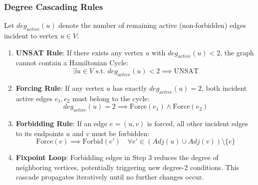 \subsubsection{Degree Cascading Rules}
Let $deg_{active}(u)$ denote the number of remaining active (non-forbidden) edges incident to vertex $u \in V$:
\begin{enumerate}
    \item \textbf{UNSAT Rule}: If there exists any vertex $u$ with $deg_{active}(u) < 2$, the graph cannot contain a Hamiltonian Cycle:
    \begin{equation}
        \exists u \in V \text{ s.t. } deg_{active}(u) < 2 \implies \text{UNSAT}
    \end{equation}
    \item \textbf{Forcing Rule}: If any vertex $u$ has exactly $deg_{active}(u) = 2$, both incident active edges $e_1, e_2$ must belong to the cycle:
    \begin{equation}
        deg_{active}(u) = 2 \implies \text{Force}(e_1) \land \text{Force}(e_2)
    \end{equation}
    \item \textbf{Forbidding Rule}: If an edge $e = (u,v)$ is forced, all other incident edges to its endpoints $u$ and $v$ must be forbidden:
    \begin{equation}
        \text{Force}(e) \implies \text{Forbid}(e') \quad \forall e' \in (Adj(u) \cup Adj(v)) \setminus \{e\}
    \end{equation}
    \item \textbf{Fixpoint Loop}: Forbidding edges in Step 3 reduces the degree of neighboring vertices, potentially triggering new degree-2 conditions. This cascade propagates iteratively until no further changes occur.
\end{enumerate}

